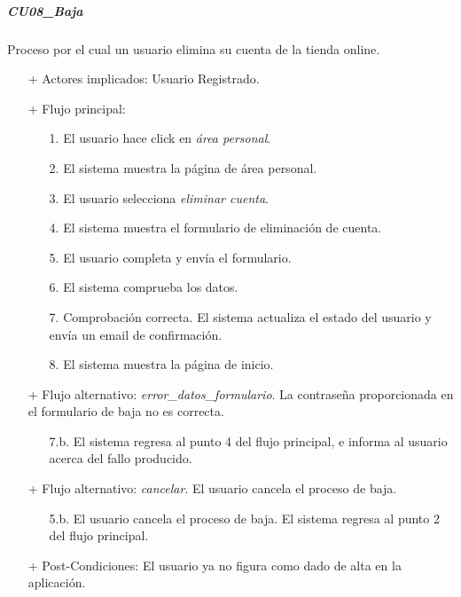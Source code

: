 \documentclass[a4paper]{article}
\begin{document}
            \subparagraph{CU08\_Baja}
                Proceso por el cual un usuario elimina su cuenta de la tienda online.
                \begin{itemize}
                    \item[+] Actores implicados: Usuario Registrado.
                    \item[+] Flujo principal:
                    \begin{enumerate}
                        \item[1.] El usuario hace click en \emph{área personal}.
                        \item[2.] El sistema muestra la página de área personal.
                        \item[3.] El usuario selecciona \emph{eliminar cuenta}.
                        \item[4.] El sistema muestra el formulario de eliminación de cuenta.
                        \item[5.] El usuario completa y envía el formulario.
                        \item[6.] El sistema comprueba los datos.
                        \item[7.] Comprobación correcta. El sistema actualiza el estado del usuario y envía un email de confirmación.
                        \item[8.] El sistema muestra la página de inicio.
                    \end{enumerate}
                    \item[+] Flujo alternativo: \emph{error\_datos\_formulario}. La contraseña proporcionada en el formulario de baja no es correcta.
                    \begin{itemize}
                        \item[7.b.] El sistema regresa al punto 4 del flujo principal, e informa al usuario acerca del fallo producido.
                    \end{itemize}
                    \item[+] Flujo alternativo: \emph{cancelar}. El usuario cancela el proceso de baja.
                    \begin{itemize}
                        \item[5.b.] El usuario cancela el proceso de baja. El sistema regresa al punto 2 del flujo principal.
                    \end{itemize}
                    \item[+] Post-Condiciones: El usuario ya no figura como dado de alta en la aplicación.
                \end{itemize}
\end{document}
